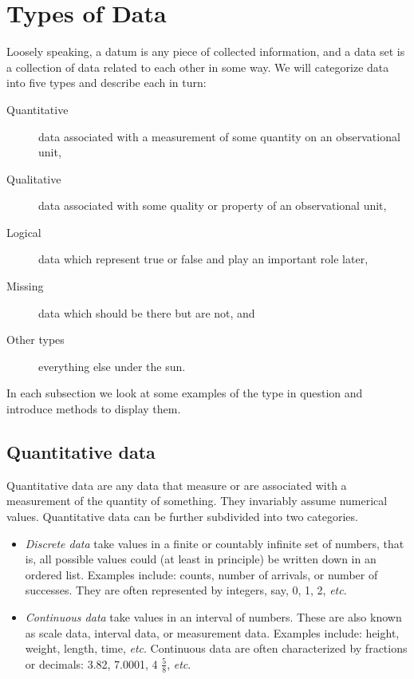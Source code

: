 \documentclass[captions=tableheading]{scrbook}
\begin{document}
\section{Types of Data}
\label{sec-3-1}
\label{sec-Types-of-Data}


Loosely speaking, a datum is any piece of collected information, and a data set is a collection of data related to each other in some way. We will categorize data into five types and describe each in turn:

\begin{description}
\item[Quantitative] data associated with a measurement of some quantity on an observational unit,
\item[Qualitative] data associated with some quality or property of an observational unit,
\item[Logical] data which represent true or false and play an important role later,
\item[Missing] data which should be there but are not, and
\item[Other types] everything else under the sun.
\end{description}

In each subsection we look at some examples of the type in question and introduce methods to display them.
\subsection{Quantitative data}
\label{sec-3-1-1}
\label{sub-Quantitative-Data}


Quantitative data are any data that measure or are associated with a measurement of the quantity of something. They invariably assume numerical values. Quantitative data can be further subdivided into two categories. 

\begin{itemize}
\item \emph{Discrete data} take values in a finite or countably infinite set of numbers, that is, all possible values could (at least in principle) be written down in an ordered list. Examples include: counts, number of arrivals, or number of successes. They are often represented by integers, say, 0, 1, 2, \emph{etc}.
\item \emph{Continuous data} take values in an interval of numbers. These are also known as scale data, interval data, or measurement data. Examples include: height, weight, length, time, \emph{etc}. Continuous data are often characterized by fractions or decimals: 3.82, 7.0001, 4 \(\frac{5}{8}\), \emph{etc}.
\end{itemize}
\end{document}
